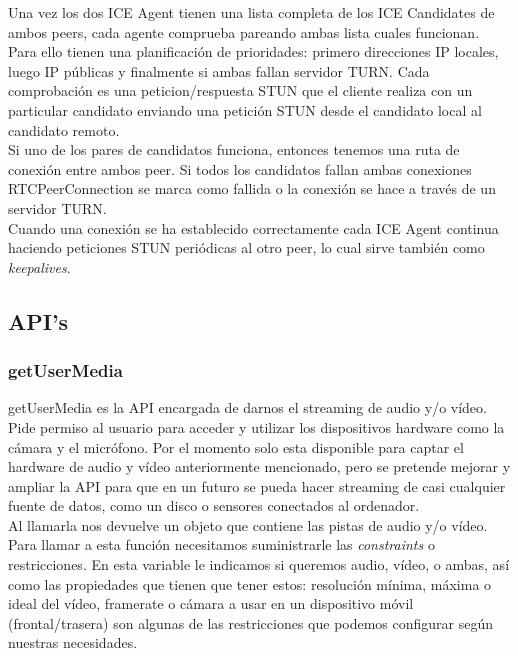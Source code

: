 Una vez los dos ICE Agent tienen una lista completa de los ICE Candidates de ambos peers, cada agente comprueba pareando ambas lista cuales funcionan. Para ello tienen una planificación de prioridades: primero direcciones IP locales, luego IP públicas y finalmente si ambas fallan servidor TURN. Cada comprobación es una peticion/respuesta STUN que el cliente realiza con un particular candidato enviando una petición STUN desde el candidato local al candidato remoto.\\

Si uno de los pares de candidatos funciona, entonces tenemos una ruta de conexión entre ambos peer. Si todos los candidatos fallan ambas conexiones RTCPeerConnection se marca como fallida o la conexión se hace a través de un servidor TURN.\\

Cuando una conexión se ha establecido correctamente cada ICE Agent continua haciendo peticiones STUN periódicas al otro peer, lo cual sirve también como \textit{keepalives}.\\

\subsection{API's}

\subsubsection{getUserMedia} 

getUserMedia es la API encargada de darnos el streaming de audio y/o vídeo. Pide permiso al usuario para acceder y utilizar los dispositivos hardware como la cámara y el micrófono. Por el momento solo esta disponible para captar el hardware de audio y vídeo anteriormente mencionado, pero se pretende mejorar y ampliar la API para que en un futuro se pueda hacer streaming de casi cualquier fuente de datos, como un disco o sensores conectados al ordenador.\\

Al llamarla nos devuelve un objeto que contiene las pistas de audio y/o vídeo. Para llamar a esta función necesitamos suministrarle las \textit{constraints} o restricciones. En esta variable le indicamos si queremos audio, vídeo, o ambas, así como las propiedades que tienen que tener estos: resolución mínima, máxima o ideal del vídeo, framerate o cámara a usar en un dispositivo móvil (frontal/trasera) son algunas de las restricciones que podemos configurar según nuestras necesidades.\\

